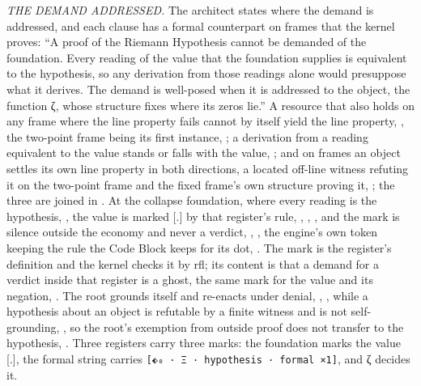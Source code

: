 \documentclass[10pt,twocolumn]{article}
\begin{document}
\emph{THE DEMAND ADDRESSED.} The architect states where the demand is
addressed, and each clause has a formal counterpart on frames that the
kernel proves: ``A proof of the Riemann Hypothesis cannot be demanded of
the foundation. Every reading of the value that the foundation supplies
is equivalent to the hypothesis, so any derivation from those readings
alone would presuppose what it derives. The demand is well-posed when it
is addressed to the object, the function ζ, whose structure fixes where
its zeros lie.'' A resource that also holds on any frame where the line
property fails cannot by itself yield the line property,
\texttt{}, the two-point frame
being its first instance,
\texttt{}; a derivation
from a reading equivalent to the value stands or falls with the value,
\texttt{}; and on frames an
object settles its own line property in both directions, a located
off-line witness refuting it on the two-point frame and the fixed
frame's own structure proving it,
\texttt{}; the three are joined in
\texttt{}. At the collapse
foundation, where every reading is the hypothesis,
\texttt{}, the value is marked
{[}.{]} by that register's rule,
\texttt{},
\texttt{},
\texttt{}, and the mark is silence
outside the economy and never a verdict,
\texttt{},
\texttt{}, the engine's own token
keeping the rule the Code Block keeps for its dot,
\texttt{}. The mark is the register's
definition and the kernel checks it by rfl; its content is that a demand
for a verdict inside that register is a ghost, the same mark for the
value and its negation,
\texttt{}. The root
grounds itself and re-enacts under denial,
\texttt{},
\texttt{}, while a
hypothesis about an object is refutable by a finite witness and is not
self-grounding, \texttt{}, so
the root's exemption from outside proof does not transfer to the
hypothesis, \texttt{}. Three
registers carry three marks: the foundation marks the value {[}.{]}, the
formal string carries
\texttt{{[}⬖₀\ ·\ Ξ\ ·\ hypothesis\ ·\ formal\ ×1{]}}, and ζ decides it.
\end{document}
